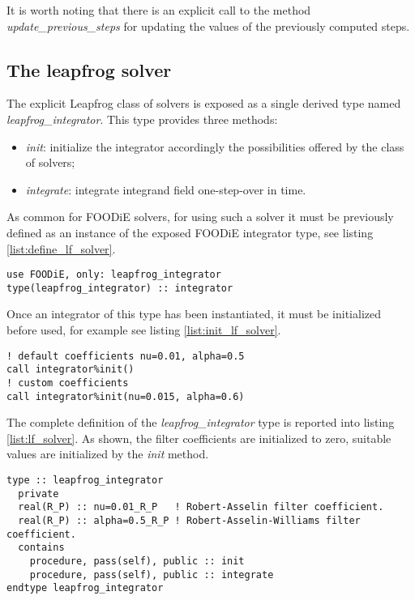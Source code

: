 \documentclass[pdftex,preprint,3p,times,numbers]{elsarticle}
\begin{document}
It is worth noting that there is an explicit call to the method \emph{update\_previous\_steps} for updating the values of the previously computed steps.

\subsection{The leapfrog solver}\label{subsec:solver_leapfrog}

The explicit Leapfrog class of solvers is exposed as a single derived type named \emph{leapfrog\_integrator}. This type provides three methods:

\begin{itemize}
  \item \emph{init}: initialize the integrator accordingly the possibilities offered by the class of solvers;
  \item \emph{integrate}: integrate integrand field one-step-over in time.
  \end{itemize}

As common for FOODiE solvers, for using such a solver it must be previously defined as an instance of the exposed FOODiE integrator type, see listing \ref{list:define_lf_solver}.

\begin{lstlisting}[firstnumber=1,style=code,caption={definition of an explicit Leapfrog integrator},label={list:define_lf_solver}]
use FOODiE, only: leapfrog_integrator
type(leapfrog_integrator) :: integrator
\end{lstlisting}

Once an integrator of this type has been instantiated, it must be initialized before used, for example see listing \ref{list:init_lf_solver}.

\begin{lstlisting}[firstnumber=1,style=code,caption={example of initialization of an explicit Leapfrog integrator},label={list:init_lf_solver}]
! default coefficients nu=0.01, alpha=0.5
call integrator%init()
! custom coefficients
call integrator%init(nu=0.015, alpha=0.6)
\end{lstlisting}

The complete definition of the \emph{leapfrog\_integrator} type is reported into listing \ref{list:lf_solver}. As shown, the filter coefficients are initialized to zero, suitable values are initialized by the \emph{init} method.

\begin{lstlisting}[firstnumber=1,style=code,caption={definition of \emph{leapfrog\_integrator} type},label={list:lf_solver}]
type :: leapfrog_integrator
  private
  real(R_P) :: nu=0.01_R_P   ! Robert-Asselin filter coefficient.
  real(R_P) :: alpha=0.5_R_P ! Robert-Asselin-Williams filter coefficient.
  contains
    procedure, pass(self), public :: init
    procedure, pass(self), public :: integrate
endtype leapfrog_integrator
\end{lstlisting}
\end{document}
